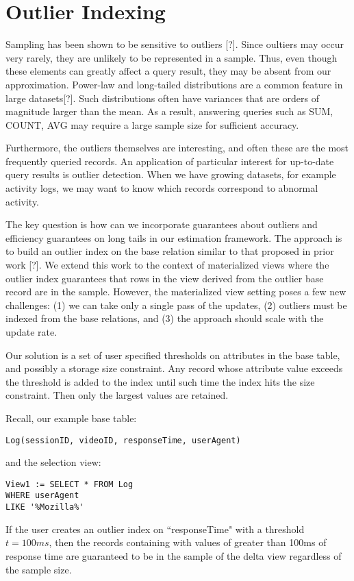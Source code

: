 \section{Outlier Indexing}
Sampling has been shown to be sensitive to outliers [?].
Since oultiers may occur very rarely, they are unlikely to be represented in a sample.
Thus, even though these elements can greatly affect a query result, they may be absent from our approximation.
Power-law and long-tailed distributions are a common feature in large datasets[?].
Such distributions often have variances that are orders of magnitude larger
than the mean.
As a result, answering queries such as SUM, COUNT, AVG may require a large 
sample size for sufficient accuracy.

Furthermore, the outliers themselves are interesting, and often these are the
most frequently queried records.
An application of particular interest for up-to-date query results
is outlier detection. When we have growing datasets, for example activity
logs, we may want to know which records correspond to abnormal activity.

The key question is how can we incorporate guarantees about outliers
and efficiency guarantees on long tails in our estimation framework.
The approach is to build an outlier index on the base relation similar to that proposed in prior work [?].
We extend this work to the context of materialized views where the outlier index guarantees
that rows in the view derived from the outlier base record are in the sample.
However, the materialized view setting poses a few new challenges: (1) we can take only
a single pass of the updates, (2) outliers must be indexed from the base relations, and
(3) the approach should scale with the update rate.

Our solution is a set of user specified thresholds on attributes in the base table, and possibly a storage size constraint.
Any record whose attribute value exceeds the threshold is added to the index until such time the index hits the size constraint.
Then only the largest values are retained.

Recall, our example base table:
\begin{lstlisting}
Log(sessionID, videoID, responseTime, userAgent)
\end{lstlisting}
and the selection view:
\begin{lstlisting}
View1 := SELECT * FROM Log 
WHERE userAgent 
LIKE '%Mozilla%'
\end{lstlisting}
If the user creates an outlier index on ``responseTime" with a threshold $t=100ms$, then
the records containing with values of greater than 100ms of response time are guaranteed to be 
in the sample of the delta view regardless of the sample size.

